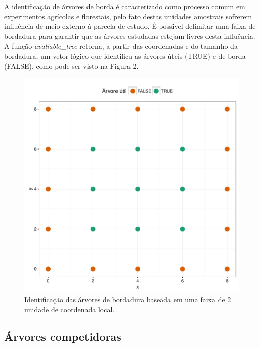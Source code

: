 \documentclass[article]{jss}
\begin{document}
A identificação de árvores de borda é caracterizado como processo comum
em experimentos agrícolas e florestais, pelo fato destas unidades
amostrais sofrerem influência de meio externo à parcela de estudo. É
possivel delimitar uma faixa de bordadura para garantir que as árvores
estudadas estejam livres desta influência. A função
\emph{avaliable\_tree} retorna, a partir das coordenadas e do tamanho da
bordadura, um vetor lógico que identifica as árvores úteis (TRUE) e de
borda (FALSE), como pode ser visto na Figura 2.

\begin{CodeChunk}
\begin{figure}

{\centering \includegraphics{comp3-paper_files/figure-latex/ex_borda-1} 

}

\caption[Identificação das árvores de bordadura baseada em uma faixa de 2 unidade de coordenada local]{Identificação das árvores de bordadura baseada em uma faixa de 2 unidade de coordenada local.}\label{fig:ex_borda}
\end{figure}
\end{CodeChunk}

\subsection{Árvores competidoras}\label{arvores-competidoras}
\end{document}
